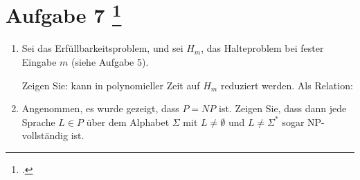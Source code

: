 \documentclass{bschlangaul-aufgabe}
\begin{document}
\bAufgabenTitel{}
\section{Aufgabe 7
\footcite{examen:66115:2014:03}}

\begin{enumerate}


\item Sei  das Erfüllbarkeitsproblem, und sei $H_m$,
das Halteproblem bei fester Eingabe $m$ (siehe Aufgabe 5).

Zeigen Sie:  kann in polynomieller Zeit auf $H_m$
reduziert werden. Als Relation:



\item Angenommen, es wurde gezeigt, dass $P = NP$ ist. Zeigen Sie, dass
dann jede Sprache $L \in P$ über dem Alphabet $\Sigma$ mit $L \neq
\emptyset$ und $L \neq \Sigma^*$ sogar NP-vollständig ist.

\end{enumerate}
\end{document}

